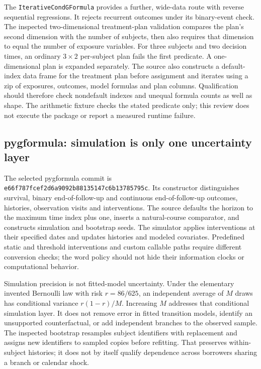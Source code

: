 The \texttt{IterativeCondGFormula} provides a further, wide-data route with
reverse sequential regressions. It rejects recurrent outcomes under its
binary-event check. The inspected two-dimensional treatment-plan validation
compares the plan's second dimension with the number of subjects, then also
requires that dimension to equal the number of exposure variables. For three
subjects and two decision times, an ordinary $3\times2$ per-subject plan
fails the first predicate. A one-dimensional plan is expanded separately.
The source also constructs a default-index data frame for the treatment plan
before assignment and iterates using a zip of exposures, outcomes, model
formulas and plan columns. Qualification should therefore check nondefault
indexes and unequal formula counts as well as shape. The arithmetic fixture
checks the stated predicate only; this review does not execute the package
or report a measured runtime failure.~\citep{exec24_longpy_zepid_source,exec24_longpy_reference}

\subsection{pygformula: simulation is only one uncertainty layer}
The selected pygformula commit is
\texttt{e66f787fcef2d6a9092b88135147c6b13785795c}.
Its constructor distinguishes survival, binary end-of-follow-up and continuous
end-of-follow-up outcomes, histories, observation visits and interventions.
The source defaults the horizon to the maximum time index plus one, inserts
a natural-course comparator, and constructs simulation and bootstrap seeds.
The simulator applies interventions at their specified dates and updates
histories and modeled covariates. Predefined static and threshold interventions
and custom callable paths require different conversion checks; the word
policy should not hide their information clocks or computational behavior.
\citep{exec24_longpy_pygformula_source}

Simulation precision is not fitted-model uncertainty. Under the elementary
invented Bernoulli law with risk $r=86/625$, an independent average of $M$
draws has conditional variance $r(1-r)/M$. Increasing $M$ addresses that
conditional simulation layer. It does not remove error in fitted transition
models, identify an unsupported counterfactual, or add independent branches
to the observed sample. The inspected bootstrap resamples subject identifiers
with replacement and assigns new identifiers to sampled copies before
refitting. That preserves within-subject histories; it does not by itself
qualify dependence across borrowers sharing a branch or calendar shock.
\citep{exec24_longpy_reference,exec24_longpy_pygformula_source}

